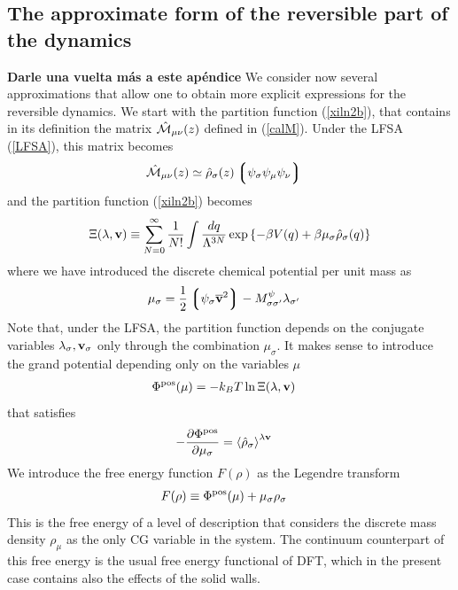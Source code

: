 \documentclass[b5paper,openright,11pt]{book}
\newcommand{\Note}[1]{{\bf \color{red}#1}}    %
\newcommand{\llangle}{\left\langle}
\newcommand{\rrangle}{\right\rangle}
\newcommand{\llg}{\left\lgroup}
\newcommand{\rlg}{\right\rgroup}
\begin{document}
\begin{appendices}
\section{The approximate form of the reversible part of the dynamics}
\label{Ap:aproxRevDyn}
\Note{Darle una vuelta más a este apéndice}
We consider now  several approximations that allow one  to obtain more
explicit expressions  for the reversible  dynamics. We start  with the
partition function (\ref{xiln2b}), that contains in its definition the
matrix $\hat{\cal M}_{\mu\nu}(z)$ defined  in (\ref{calM}).  Under the
LFSA (\ref{LFSA}), this matrix becomes
\begin{align}
  \hat{\cal M}_{\mu\nu}(z)
&\simeq\hat{\rho}_\sigma(z)\llg\psi_\sigma\psi_\mu\psi_\nu\rlg
\label{Mapprox}
\end{align}
and the partition function (\ref{xiln2b}) becomes
\begin{align}
\Xi(\lambda,{\bf v})\equiv \sum_{N=0}^\infty \frac{1}{N!}
\int \frac{dq}{\Lambda^{3N}}
\exp\left\{-\beta V(q)+\beta\mu_\sigma\hat{\rho}_{\sigma}(q)
\right\}
\label{xiln3}
\end{align}
where we have introduced the discrete chemical potential per unit mass as
\begin{align}
\mu_\sigma&=\frac{1}{2}\llg\psi_\sigma\overline{\bf v}^2\rlg-  M^\psi_{\sigma\sigma'}\lambda_{\sigma'}
\label{ChemPot}
\end{align}
Note  that, under  the LFSA,  the  partition function  depends on  the
conjugate variables  $\lambda_\sigma,{\bf v}_\sigma$ only  through the
combination  $\mu_\sigma$.   It makes  sense  to  introduce the  grand
potential depending only on the variables $\mu$
\begin{align}
  \Phi^{\rm pos}(\mu)&=-k_BT\ln \Xi(\lambda,{\bf v})
\end{align}
that satisfies
\begin{align}
-\frac{\partial \Phi^{\rm pos}}{\partial\mu_\sigma}&=
\llangle \hat{\rho}_\sigma\rrangle^{\lambda{\bf v}}
\end{align}
We introduce the free  energy function $F(\rho)$ as the Legendre
transform
\begin{align}
  F(\rho)&\equiv  \Phi^{\rm pos}(\mu)+ \mu_\sigma \rho_\sigma
\label{leg}
\end{align}
This is the  free energy of a level of  description that considers the
discrete  mass density  $\rho_\mu$  as  the only  CG  variable in  the
system. The  continuum counterpart  of this free  energy is  the usual
free energy functional of DFT, which in the present case contains also
the effects of the solid walls. 


\end{appendices}
\end{document}
